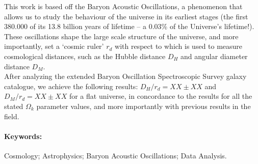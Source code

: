 This work is based off the Baryon Acoustic Oscillations, a phenomenon that allows us to study the behaviour of the universe in its earliest stages (the first 380.000 of its 13.8 billion years of lifetime -- a 0.03\% of the Universe's lifetime!). These oscillations shape the large scale structure of the universe, and more importantly, set a `cosmic ruler' $r_d$ with respect to which is used to measure cosmological distances, such as the Hubble distance $D_H$ and angular diameter distance $D_M$.\\

After analyzing the extended Baryon Oscillation Spectroscopic Survey galaxy catalogue, we achieve the following results: $D_H/r_d = XX\pm XX$ and $D_M /r_d = XX \pm XX$ for a flat universe, in concordance to the results for all the stated  $\Omega_k$ parameter values, and more importantly with previous results in the field.





\paragraph{Keywords:} Cosmology; Astrophysics; Baryon Acoustic Oscillations; Data Analysis.
